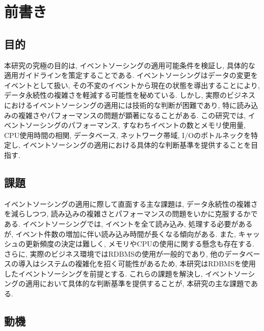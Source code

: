 \documentclass[../../main]{subfiles}
\begin{document}
    \section{前書き}\label{sec:preface}

    \subsection{目的}\label{subsec:preface-purpose}

    本研究の究極の目的は, イベントソーシングの適用可能条件を検証し, 具体的な適用ガイドラインを策定することである. イベントソーシングはデータの変更をイベントとして扱い, その不変のイベントから現在の状態を導出することにより, データ永続性の複雑さを軽減する可能性を秘めている. しかし, 実際のビジネスにおけるイベントソーシングの適用には技術的な判断が困難であり, 特に読み込みの複雑さやパフォーマンスの問題が顕著になることがある. この研究では, イベントソーシングのパフォーマンス, すなわちイベントの数とメモリ使用量, CPU使用時間の相関, データベース, ネットワーク帯域, I/Oのボトルネックを特定し, イベントソーシングの適用における具体的な判断基準を提供することを目指す.

    \subsection{課題}\label{subsec:preface-problem}

    イベントソーシングの適用に際して直面する主な課題は, データ永続性の複雑さを減らしつつ, 読み込みの複雑さとパフォーマンスの問題をいかに克服するかである. イベントソーシングでは, イベントを全て読み込み, 処理する必要があるが, イベント件数の増加に伴い読み込み時間が長くなる傾向がある. また, キャッシュの更新頻度の決定は難しく, メモリやCPUの使用に関する懸念も存在する. さらに, 実際のビジネス環境ではRDBMSの使用が一般的であり, 他のデータベースの導入はシステムの複雑化を招く可能性があるため, 本研究はRDBMSを使用したイベントソーシングを前提とする. これらの課題を解決し, イベントソーシングの適用において具体的な判断基準を提供することが, 本研究の主な課題である.

    \subsection{動機}\label{subsec:preface-motive}
\end{document}
